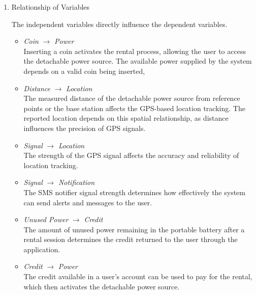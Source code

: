 {\begin{enumerate}[label=\alph*.]
\begin{itemize}
		\item \textit{Credit} –  Refers to the digital value or reward points that the user earns in the mobile app after returning the rented detachable power source. The credit amount is calculated based on how much unused power remains in the device upon return.
		
	\end{itemize}
	
	\item Relationship of Variables
	
	The independent variables directly influence the dependent variables.
	
		\begin{itemize}
		 \item \textit{Coin} $\rightarrow$ \textit{Power}\\
		  Inserting a coin activates the rental process, allowing the user to access the detachable power source. The available power supplied by the system depends on a valid coin being inserted,
		
		\item \textit{Distance} $\rightarrow$ \textit{Location}\\ 
		The measured distance of the detachable power source from reference points or the base station affects the GPS-based location tracking. The reported location depends on this spatial relationship, as distance influences the precision of GPS signals.
		
		 \item \textit{Signal} $\rightarrow$ \textit{Location}\\ 
	    The strength of the GPS signal affects the accuracy and reliability of location tracking. 
		 
		  \item \textit{Signal} $\rightarrow$ \textit{Notification}\\
		  The SMS notifier signal strength determines how effectively the system can send alerts and messages to the user. 
		  
		   \item \textit{Unused Power} $\rightarrow$ \textit{Credit}\\
		   The amount of unused power remaining in the portable battery after a rental session determines the credit returned to the user through the application. 
		   
		    \item \textit{Credit} $\rightarrow$ \textit{ Power}\\
		    The credit available in a user’s account can be used to pay for the rental, which then activates the detachable power source.
		    

\end{itemize}
\end{enumerate}}
